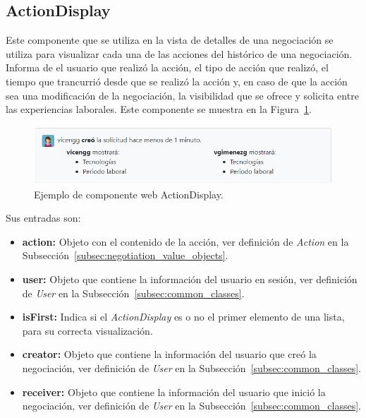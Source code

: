 \documentclass[a4paper, 12pt]{book}
\begin{document}
    \subsection{ActionDisplay}
    \label{subsec:wc_action_display}
    Este componente que se utiliza en la vista de detalles de una negociación se utiliza para visualizar cada una de las acciones del histórico de una negociación.
    Informa de el usuario que realizó la acción, el tipo de acción que realizó, el tiempo que trancurrió desde que se realizó la acción y, en caso de que la acción sea una modificación de la negociación, la visibilidad que se ofrece y solicita entre las experiencias laborales.
    Este componente se muestra en la Figura~\ref{fig:component_action_display}.

    \begin{figure}
        \centering
        \includegraphics[width=15cm, keepaspectratio]{img/ActionDisplay.PNG}
        \caption{Ejemplo de componente web ActionDisplay.}\label{fig:component_action_display}
    \end{figure}

    Sus entradas son:

    \begin{itemize}
        \item \textbf{action:} Objeto con el contenido de la acción, ver definición de \emph{Action} en la Subsección~\ref{subsec:negotiation_value_objects}.
        \item \textbf{user:} Objeto que contiene la información del usuario en sesión, ver definición de \emph{User} en la Subsección~\ref{subsec:common_classes}.
        \item \textbf{isFirst:} Indica si el \emph{ActionDisplay} es o no el primer elemento de una lista, para su correcta visualización.
        \item \textbf{creator:} Objeto que contiene la información del usuario que creó la negociación, ver definición de \emph{User} en la Subsección~\ref{subsec:common_classes}.
        \item \textbf{receiver:} Objeto que contiene la información del usuario que inició la negociación, ver definición de \emph{User} en la Subsección~\ref{subsec:common_classes}.
    \end{itemize}
\end{document}
